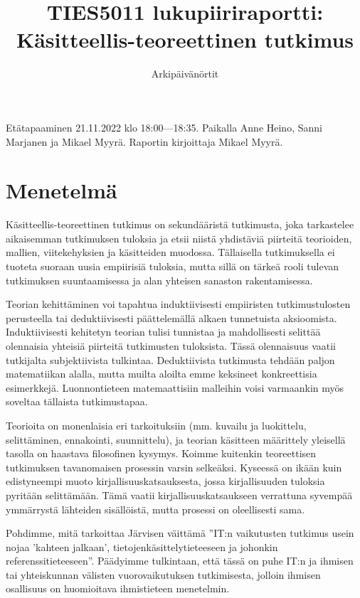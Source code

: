 \documentclass{article}
\title{TIES5011 lukupiiriraportti: Käsitteellis-teoreettinen tutkimus}
\author{Arkipäivänörtit}
\date{}
\begin{document}
\maketitle

Etätapaaminen 21.11.2022 klo 18:00—18:35.
Paikalla Anne Heino, Sanni Marjanen ja Mikael Myyrä.
Raportin kirjoittaja Mikael Myyrä.

\section*{Menetelmä}

Käsitteellis-teoreettinen tutkimus on sekundääristä tutkimusta, joka
tarkastelee aikaisemman tutkimuksen tuloksia ja etsii niistä yhdistäviä
piirteitä teorioiden, mallien, viitekehyksien ja käsitteiden muodossa.
Tällaisella tutkimuksella ei tuoteta suoraan uusia empiirisiä tuloksia, mutta
sillä on tärkeä rooli tulevan tutkimuksen suuntaamisessa ja alan yhteisen
sanaston rakentamisessa.

Teorian kehittäminen voi tapahtua induktiivisesti empiiristen tutkimustulosten
perusteella tai deduktiivisesti päättelemällä alkaen tunnetuista aksioomista.
Induktiivisesti kehitetyn teorian tulisi tunnistaa ja mahdollisesti selittää
olennaisia yhteisiä piirteitä tutkimusten tuloksista. Tässä olennaisuus vaatii
tutkijalta subjektiivista tulkintaa. Deduktiivista tutkimusta tehdään paljon
matematiikan alalla, mutta muilta aloilta emme keksineet konkreettisia
esimerkkejä. Luonnontieteen matemaattisiin malleihin voisi varmaankin myös
soveltaa tällaista tutkimustapaa.

Teorioita on monenlaisia eri tarkoituksiin (mm. kuvailu ja luokittelu,
selittäminen, ennakointi, suunnittelu), ja teorian käsitteen määrittely
yleisellä tasolla on haastava filosofinen kysymys. Koimme kuitenkin
teoreettisen tutkimuksen tavanomaisen prosessin varsin selkeäksi. Kyseessä on
ikään kuin edistyneempi muoto kirjallisuuskatsauksesta, jossa kirjallisuuden
tuloksia pyritään selittämään. Tämä vaatii kirjallisuuskatsaukseen verrattuna
syvempää ymmärrystä lähteiden sisällöistä, mutta prosessi on oleellisesti sama.

Pohdimme, mitä tarkoittaa Järvisen väittämä ''IT:n vaikutusten tutkimus usein
nojaa 'kahteen jalkaan', tietojenkäsittelytieteeseen ja johonkin
referenssitieteeseen''. Päädyimme tulkintaan, että tässä on puhe IT:n ja
ihmisen tai yhteiskunnan välisten vuorovaikutuksen tutkimisesta, jolloin
ihmisen osallisuus on huomioitava ihmistieteen menetelmin.
\end{document}
